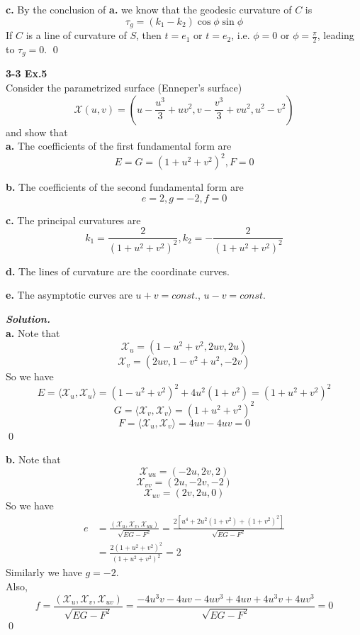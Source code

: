 \documentclass{article}
\begin{document}
\par
\textbf{c. }
By the conclusion of \textbf{a.} we know that the geodesic curvature of $C$ is
$$
\tau_g = (k_1 - k_2)\cos\phi \sin \phi
$$
If $C$ is a line of curvature of $S$, then $t=e_1$ or $t=e_2$,
i.e. $\phi = 0$ or $\phi = \frac{\pi}{2}$, leading to $\tau_g = 0$. \qed

\textbf{3-3 Ex.5}\\
Consider the parametrized surface (Enneper's surface)
$$
    \mathcal{X}(u,v) = (u - \frac{u^3}{3} + uv^2, v - \frac{v^3}{3} + vu^2, u^2 - v^2)
$$
and show that\\
\textbf{a. }The coefficients of the first fundamental form are
$$
    E = G = (1+u^2+v^2)^2, F = 0
$$
\par
\textbf{b. }The coefficients of the second fundamental form are
$$
    e = 2, g = -2, f = 0
$$
\par
\textbf{c. }The principal curvatures are
$$
    k_1 = \frac{2}{(1+u^2+v^2)^2}, k_2 = - \frac{2}{(1+u^2+v^2)^2}
$$
\par
\textbf{d. }The lines of curvature are the coordinate curves.
\par
\textbf{e. }The asymptotic curves are $u+v=const.$, $u-v=const.$

\par
\textbf{\textit{Solution.}}\\
\textbf{a. }Note that
$$
    \mathcal{X}_u = (1 - u^2 + v^2, 2uv, 2u)
$$
$$
    \mathcal{X}_v = (2uv, 1 - v^2 + u^2, -2v)
$$
So we have
$$
    E = \langle \mathcal{X}_u, \mathcal{X}_u\rangle = (1-u^2+v^2)^2 + 4u^2(1+v^2) = (1+u^2+v^2)^2
$$
$$
    G = \langle \mathcal{X}_v, \mathcal{X}_v\rangle = (1+u^2+v^2)^2
$$
$$
    F = \langle \mathcal{X}_u, \mathcal{X}_v\rangle = 4uv - 4uv = 0
$$
\qed

\par
\textbf{b. }Note that
$$
    \mathcal{X}_{uu} = (-2u, 2v, 2)
$$
$$
    \mathcal{X}_{vv} = (2u, -2v, -2)
$$
$$
    \mathcal{X}_{uv} = (2v, 2u, 0)
$$
So we have
$$
\begin{aligned}
    e &= \frac{(\mathcal{X}_u, \mathcal{X}_v, \mathcal{X}_{uu})}{\sqrt{EG-F^2}}
    = \frac{2[u^4 + 2u^2(1+v^2)+(1+v^2)^2]}{\sqrt{EG-F^2}}\\
    &= \frac{2(1+u^2+v^2)^2}{(1+u^2+v^2)^2} = 2
\end{aligned}
$$
Similarly we have $g = -2$.\\
Also,
$$
    f = \frac{(\mathcal{X}_u, \mathcal{X}_v, \mathcal{X}_{uv})}{\sqrt{EG-F^2}}
    = \frac{-4u^3v-4uv-4uv^3+4uv+4u^3v+4uv^3}{\sqrt{EG-F^2}} = 0
$$
\qed
\end{document}
